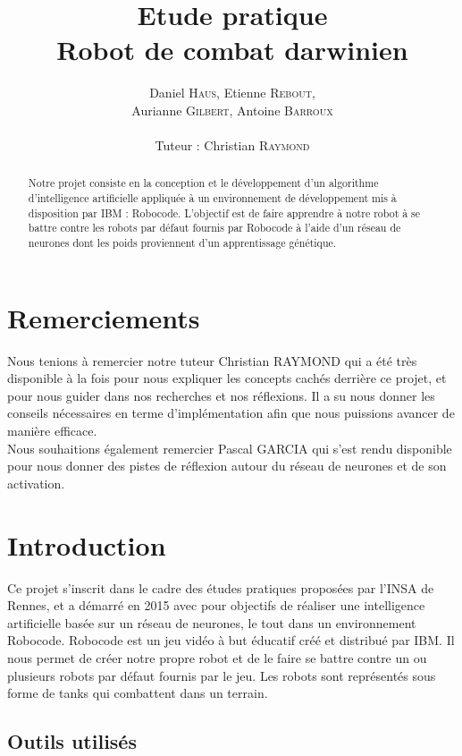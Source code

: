 \documentclass[a4paper,11pt]{article}
\title{ \textbf{Etude pratique \\
    Robot de combat darwinien} }
\author{Daniel \textsc{Haus}, Etienne \textsc{Rebout}, \\
        Aurianne \textsc{Gilbert}, Antoine \textsc{Barroux} \\
        \\
        Tuteur : Christian \textsc{Raymond}}
\date{}                    %
\begin{document}
          

\maketitle                 %
\thispagestyle{empty}      %



\begin{abstract}
Notre projet consiste en la conception et le développement d'un algorithme d'intelligence artificielle appliquée à un environnement de développement mis à disposition par IBM : Robocode. L'objectif est de faire apprendre à notre robot à se battre contre les robots par défaut fournis par Robocode à l'aide  d'un réseau de neurones dont les poids proviennent d'un apprentissage génétique. 
\end{abstract} 

\section{Remerciements}
Nous tenions à remercier notre tuteur Christian RAYMOND qui a été très disponible à la fois pour nous expliquer les concepts cachés derrière ce projet, et pour nous guider dans nos recherches et nos réflexions. Il a su nous donner les conseils nécessaires en terme d'implémentation afin que nous puissions avancer de manière efficace.\\
Nous souhaitions également remercier Pascal GARCIA qui s'est rendu disponible pour nous donner des pistes de réflexion autour du réseau de neurones et de son activation.

\section{Introduction}  

Ce projet s'inscrit dans le cadre des études pratiques proposées par l'INSA de Rennes, et a démarré en 2015 avec pour objectifs de réaliser une intelligence artificielle basée sur un réseau de neurones, le tout dans un environnement Robocode. Robocode est un jeu vidéo à but éducatif créé et distribué par IBM. Il nous permet de créer notre propre robot et de le faire se battre contre un ou plusieurs robots par défaut fournis par le jeu. Les robots sont représentés sous forme de tanks qui combattent dans un terrain. 

\subsection{Outils utilisés}
\end{document}
